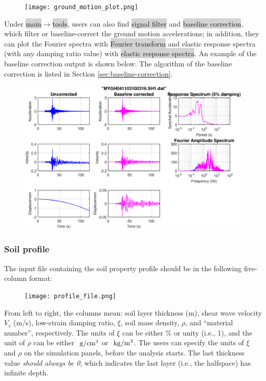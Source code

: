 \documentclass[11pt,letterpaper]{article}
\newcommand{\panel}[1]{\colorbox{lightgray}{\textsf{#1}}}
\begin{document}
\begin{figure}[H]
\centering
  \texttt{[image: ground\_motion\_plot.png]}\\
\end{figure}

Under \panel{main}$\rightarrow$\panel{tools}, users can also find \panel{signal filter} and \panel{baseline correction}, which filter or baseline-correct the ground motion accelerations; in addition, they can plot the Fourier spectra with \panel{Fourier transform} and elastic response spectra (with any damping ratio value) with \panel{elastic response spectra}. An example of the baseline correction output is shown below. The algorithm of the baseline correction is listed in Section \ref{sec:baseline-correction}.

\begin{figure}[H]
\centering
  \includegraphics[width=.99\textwidth]{baseline_correction_result_new.eps}\\
  \label{fig:baseline_result}
\end{figure}

\subsubsection{Soil profile}\label{sec:soil_profile}

The input file containing the soil property profile should be in the following five-column format:

\begin{figure}[H]
\centering
  \texttt{[image: profile\_file.png]}\\
\end{figure}

From left to right, the columns mean: soil layer thickness (m), shear wave velocity $V_s$ (m/s), low-strain damping ratio, $\xi$, soil mass density, $\rho$, and ``material number'', respectively. The units of $\xi$ can be either \% or unity (i.e., 1), and the unit of $\rho$ can be either $~\mathrm{g/cm^3}$ or $~\mathrm{kg/m^3}$. The users can specify the units of $\xi$ and $\rho$ on the simulation panels, before the analysis starts. The last thickness value \emph{should always be 0}, which indicates the last layer (i.e., the halfspace) has infinite depth.
\end{document}

